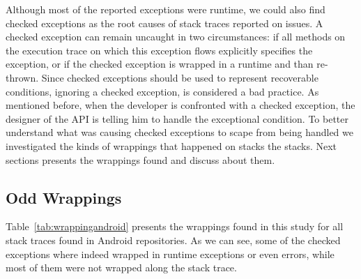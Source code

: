 \documentclass[conference]{IEEEtran}
\begin{document}
Although most of the  reported exceptions were runtime, we could also find checked
exceptions as the root causes of stack traces reported on issues. A checked exception
can remain uncaught in two circumstances: if all methods on the execution trace
on which this exception flows explicitly specifies the exception, or if the
checked exception is wrapped in a runtime and than re-thrown. Since checked exceptions 
should be used to represent recoverable conditions, ignoring a
checked exception, is considered a bad practice. As mentioned before, when the developer is confronted
with a checked exception, the designer of the API is telling him to handle the
exceptional condition. To better understand what was causing checked exceptions
to scape from being handled we investigated the kinds of wrappings that happened
on stacks the stacks.  Next sections presents the wrappings found and discuss
about them.

\subsection{Odd Wrappings}
Table~\ref{tab:wrappingandroid} presents the wrappings found in this study for all
stack traces found in Android repositories. As we can see, some of the checked
exceptions where indeed wrapped in runtime exceptions or even errors, while most
of them were not wrapped along the stack trace. 
\end{document}
